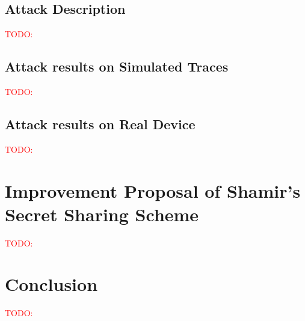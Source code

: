 \documentclass{llncs}
\newcommand\todo[1]{\textcolor{red}{TODO: #1}}
\begin{document}
\subsection{Attack Description}
 \todo{}
\subsection{Attack results on Simulated Traces}
 \todo{}
\subsection{Attack results on Real Device}
 \todo{}


\section{Improvement Proposal of Shamir's Secret Sharing Scheme}
 \todo{}

\section{Conclusion}
\label{sec-conc}
 \todo{}
 


\end{document}
